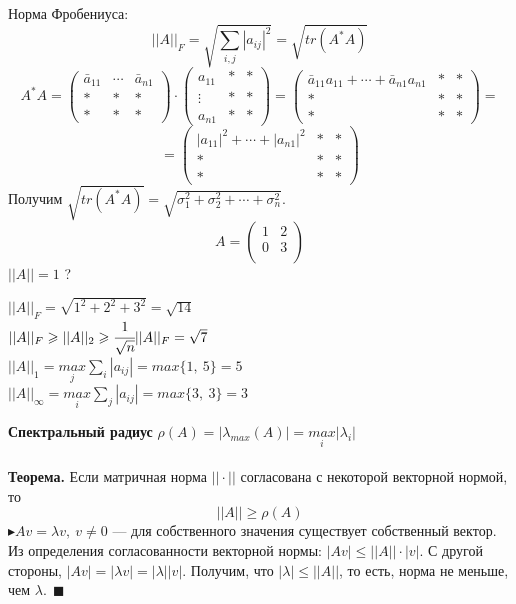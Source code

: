 \documentclass[12pt]{article}
\theoremstyle{definition}
\numberwithin{equation}{section}
\begin{document}
~\\ \\Норма Фробениуса: $$||A||_F=\sqrt{\sum\limits_{i,j}|a_{ij}|^2}=\sqrt{tr(A^*A)}$$
\[A^*A=\begin{pmatrix}
\bar a_{11} & \cdots & \bar a_{n1}\\
* & * & *\\
* & * & *
\end{pmatrix} \cdot \begin{pmatrix}
a_{11} & * & *\\
\vdots & * & *\\
a_{n1} & * & *
\end{pmatrix} = \begin{pmatrix}
\bar a_{11} a_{11}+\cdots+\bar a_{n1} a_{n1} & * & *\\
* & * & *\\
* & * & *
\end{pmatrix}=\] \[=\begin{pmatrix}
|a_{11}|^2+\cdots +|a_{n1}|^2 & * & *\\
* & * & *\\
* & * & *
\end{pmatrix}\]
Получим $\sqrt{tr(A^*A)}=\sqrt{\sigma_1^2+\sigma_2^2+\cdots+\sigma_n^2}$.
\[A=\begin{pmatrix}
1 & 2\\
0 & 3\\
\end{pmatrix}\]
$||A||=1$ ?\begin{center}
$||A||_F=\sqrt{1^2+2^2+3^2}=\sqrt{14}$\\
$||A||_F \geqslant ||A||_2 \geqslant \cfrac{1}{\sqrt{n}}||A||_F=\sqrt{7}$\\
$||A||_1=\underset{j}{max}\sum\limits_i|a_{ij}|=max\{1,~5\}=5$\\
$||A||_{\infty}=\underset{i}{max}\sum\limits_j|a_{ij}|=max\{3,~3\}=3$\end{center}
\textbf{Спектральный радиус} $\rho(A)=|\lambda_{max}(A)|=\underset{i}{max}|\lambda_i|$\\
\\
\textbf{Теорема.} Если матричная норма $||\cdot||$ согласована с некоторой векторной нормой, то $$||A|| \geqslant \rho(A)$$
$\blacktriangleright Av=\lambda v,~v\neq 0$ --- для собственного значения существует собственный вектор.\\
Из определения согласованности векторной нормы: $|Av|\leqslant ||A||\cdot|v|$.
С другой стороны, $|Av|=|\lambda v|=|\lambda||v|$. Получим, что $|\lambda|\leqslant ||A||$, то есть, норма не меньше, чем $\lambda.~~\blacksquare$\\
\end{document}
